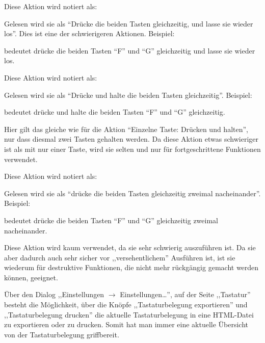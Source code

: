 Diese Aktion wird notiert als:
\begin{quotation}
\end{quotation}
Gelesen wird sie als ``Drücke die beiden Tasten gleichzeitig, und lasse sie wieder los''. Dies ist eine der schwierigeren Aktionen. Beispiel:
\begin{quotation}
\end{quotation}
bedeutet drücke die beiden Tasten ``F'' und ``G'' gleichzeitig und lasse sie wieder los.

Diese Aktion wird notiert als:
\begin{quotation}
\end{quotation}
Gelesen wird sie als ``Drücke und halte die beiden Tasten gleichzeitig''. Beispiel:
\begin{quotation}
\end{quotation}
bedeutet drücke und halte die beiden Tasten ``F'' und ``G'' gleichzeitig.

Hier gilt das gleiche wie für die Aktion ``Einzelne Taste: Drücken und halten'', nur dass diesmal zwei Tasten gehalten werden. Da diese Aktion etwas schwieriger ist als mit nur einer Taste, wird sie selten und nur für fortgeschrittene Funktionen verwendet.

 Diese Aktion wird notiert als:
\begin{quotation}
\end{quotation}
Gelesen wird sie als ``drücke die beiden Tasten gleichzeitig zweimal nacheinander''.  Beispiel:
\begin{quotation}
\end{quotation}
bedeutet drücke die beiden Tasten ``F'' und ``G'' gleichzeitig zweimal nacheinander.

Diese Aktion wird kaum verwendet, da sie sehr schwierig auszuführen ist. Da sie aber dadurch auch sehr sicher vor ,,versehentlichem'' Ausführen ist, ist sie wiederum für destruktive Funktionen, die nicht mehr rückgängig gemacht werden können, geeignet.

Über den Dialog ,,Einstellungen $\rightarrow$ Einstellungen\dots'', auf der Seite ,,Tastatur'' besteht die Möglichkeit, über die Knöpfe ,,Tastaturbelegung exportieren'' und ,,Tastaturbelegung drucken'' die aktuelle Tastaturbelegung in eine HTML-Datei zu exportieren oder zu drucken. Somit hat man immer eine aktuelle Übersicht von der Tastaturbelegung griffbereit.
